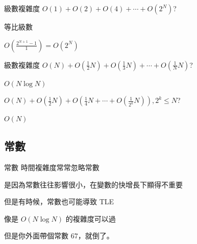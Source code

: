 \begin{frame}{級數複雜度}
    $O(1) + O(2) + O(4) + \cdots + O(2^N)$?\pause

    等比級數

    $\displaystyle O(\frac{2^{N+1}-1}{1}) = O(2^N)$
\end{frame}

\begin{frame}{級數複雜度}
    $O(N) + O(\frac{1}{2}N) + O(\frac{1}{3}N) + \cdots + O(\frac{1}{N}N)$?\pause

    $O(N \log{N})$\pause

    $O(N) + O(\frac{1}{2}N) + O(\frac{1}{4}N + \cdots + O(\frac{1}{2^k}N)), 2^k \le N$?\pause

    $O(N)$
\end{frame}

\subsection{常數}

\begin{frame}{常數}
    時間複雜度常常忽略常數

    是因為常數往往影響很小，在變數的快增長下顯得不重要\pause

    但是有時候，常數也可能導致 TLE 

    像是 $O(N\log{N})$ 的複雜度可以過

    但是你外面帶個常數 $67$，就倒了。
\end{frame}
